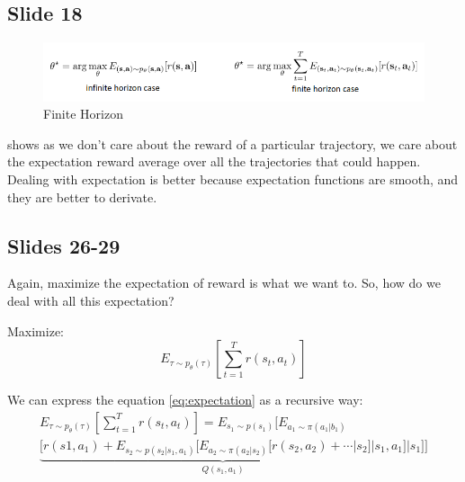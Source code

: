 \documentclass[]{article}
\begin{document}
\subsection*{Slide 18}%
\label{sub:Slide 18}

\begin{figure}
\begin{center}
    \includegraphics[scale=0.5]{cap3img/expectation2.png}
\end{center}
\caption{Finite Horizon}
\label{fig:horizon}
\end{figure}

 shows as we don't care about the reward of a particular trajectory, we care about the
expectation reward average over all the trajectories that could happen. Dealing with expectation is better because
expectation functions are smooth, and they are better to derivate. 


\subsection*{Slides 26-29}%
\label{sub:Slides 26-29}

\par Again, maximize the expectation of reward is what we want to. So, how do we deal with all this expectation?

Maximize: 
\begin{equation}
    \label{eq:expectation}
    \mathit{E}_{\tau \sim p_{\theta}(\tau)}\left [ \sum_{t=1}^{T}r(s_{t},a_{t}) \right] 
\end{equation}
\par We can express the equation \eqref{eq:expectation} as a recursive way:
\begin{equation}
        \begin{split}
        \mathit{E}_{\tau \sim p_{\theta}(\tau)}\left [ \sum_{t=1}^{T}r(s_{t},a_{t}) \right]  = 
        \mathit{E}_{s_{1} \sim p(s_{1})} \big[ \mathit{E}_{a_{1} \sim \pi(a_{1}|b_{1})} \\ \underbrace{\big[ r(s{1},a_{1}) +  
                \mathit{E}_{s_{2} \sim p(s_{2}|s_{1},a_{1})}\big[\mathit{E}_{a_{2} \sim \pi(a_{2}|s_{2})} \big[ 
    r(s_{2},a_{2}) + \cdots | s_{2}  \big]|s_{1},a_{1}\big]}_{Q(s_{1},a_{1})} |s_{1}\big]\big]
        \end{split}
\end{equation}
\end{document}
